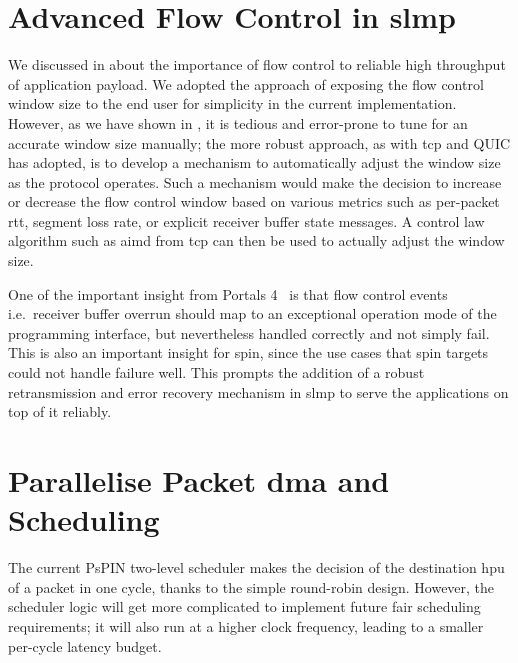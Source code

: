 
\section{Advanced Flow Control in \acs{slmp}} \label{sec:slmp-fc-future-work}

We discussed in  about the importance of flow control to reliable high throughput of application payload.  We adopted the approach of exposing the flow control window size to the end user for simplicity in the current implementation.  However, as we have shown in , it is tedious and error-prone to tune for an accurate window size manually; the more robust approach, as with \ac{tcp} and QUIC has adopted, is to develop a mechanism to automatically adjust the window size as the protocol operates.  Such a mechanism would make the decision to increase or decrease the flow control window based on various metrics such as per-packet \ac{rtt}, segment loss rate, or explicit receiver buffer state messages.  A control law algorithm such as \ac{aimd} from \ac{tcp} can then be used to actually adjust the window size.

One of the important insight from Portals 4~\cite{barrett_portals_nodate} is that flow control events i.e.\ receiver buffer overrun should map to an exceptional operation mode of the programming interface, but nevertheless handled correctly and not simply fail.  This is also an important insight for \ac{spin}, since the use cases that \ac{spin} targets could not handle failure well.  This prompts the addition of a robust retransmission and error recovery mechanism in \ac{slmp} to serve the applications on top of it reliably.

\section{Parallelise Packet \acs{dma} and Scheduling} \label{sec:ingress-latency-hiding}

The current PsPIN two-level scheduler makes the decision of the destination \ac{hpu} of a packet in one cycle, thanks to the simple round-robin design.  However, the scheduler logic will get more complicated to implement future fair scheduling requirements; it will also run at a higher clock frequency, leading to a smaller per-cycle latency budget.

